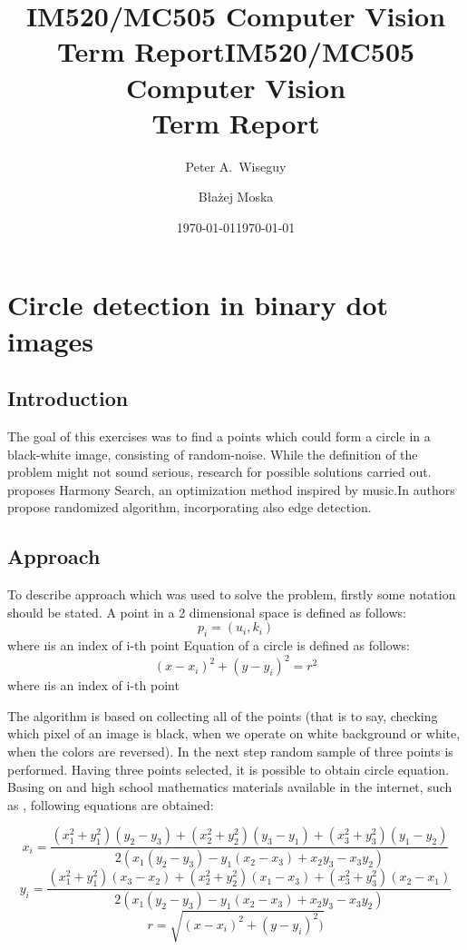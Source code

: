 \documentclass[notitlepage,english]{hgbreport}
\author{Peter A.\ Wiseguy}
\title{IM520/MC505 Computer Vision\\ %
			Term Report}
\date{\today}
\author{Błażej Moska}
\title{IM520/MC505 Computer Vision\\ %
			Term Report}
\date{\today}
\begin{document}
\maketitle
\thispagestyle{empty} 



\chapter{Circle detection in binary dot images}


\section {Introduction}
The goal of this exercises was to find a points which could form a circle in a black-white image, consisting of random-noise. While the definition of the problem might not sound serious, research for possible solutions carried out.\cite{fourie2017robust} proposes Harmony Search, an optimization method inspired by music.In \cite{alomari2013randomized} authors propose randomized algorithm, incorporating also edge detection.


\section {Approach}

To describe approach which was used to solve the problem, firstly some notation should be stated. A point in a 2 dimensional space is defined as follows:
\[p_{i}=(u_{i},k_{i})\]
where \i is an index of i-th point
Equation of a circle is defined as follows:
\[(x-x_{i})^2+(y-y_{i})^2=r^2\]
where \i is an index of i-th point


The algorithm is based on collecting all of the points (that is to say, checking which pixel of an image is black, when we operate on white background or white, when the colors are reversed). In the next step random sample of three points is performed. Having three points selected,  it is possible to obtain circle equation. Basing on \cite{wiki:Circles} and high school mathematics materials available in the internet, such as \cite{eisle}, following equations are obtained:

\[x_{i}=\frac{(x_{1}^2+y_{1}^2)(y_{2}-y_{3})+(x_{2}^2+y_{2}^2)(y_{3}-y_{1})+(x_{3}^2+y_{3}^2)(y_{1}-y_{2})}{2(x_{1}(y_{2}-y_{3})-y_{1}(x_{2}-x_{3})+x_{2}y_{3}-x_{3}y_{2})}\]
\[y_{i}=\frac{(x_{1}^2+y_{1}^2)(x_{3}-x_{2})+(x_{2}^2+y_{2}^2)(x_{1}-x_{3})+(x_{3}^2+y_{3}^2)(x_{2}-x_{1})} {2(x_{1}(y_{2}-y_{3})-y_{1}(x_{2}-x_{3})+x_{2}y_{3}-x_{3}y_{2})}\]
\[r=\sqrt{(x-x_{i})^2+(y-y_{i})^2)}\]
\end{document}
